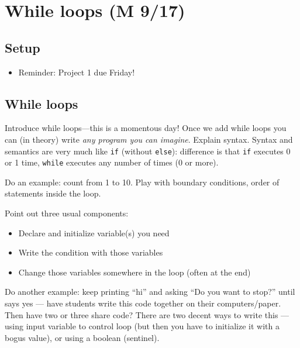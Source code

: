 \documentclass{article}
\newcommand{\eg}{\emph{e.g.}\xspace}
\begin{document}

\newpage
\section{While loops (M 9/17)}

\subsection*{Setup}
\begin{itemize}
\item Reminder: Project 1 due Friday!
\end{itemize}

\subsection*{While loops}

Introduce while loops---this is a momentous day!  Once we add while
loops you can (in theory) write \emph{any program you can imagine}.
Explain syntax.  Syntax and semantics are very much like \verb|if|
(without \verb|else|): difference is that \verb|if| executes 0 or 1
time, \verb|while| executes any number of times (0 or more).

Do an example: count from 1 to 10.  Play with boundary conditions,
order of statements inside the loop.

Point out three usual components:
\begin{itemize}
\item Declare and initialize variable(s) you need
\item Write the condition with those variables
\item Change those variables somewhere in the loop (often at the
  end)
\end{itemize}

Do another example: keep printing ``hi'' and asking ``Do you want to
stop?'' until says yes --- have students write this code together on
their computers/paper.  Then have two or three share code?  There are
two decent ways to write this --- using input variable to control loop
(but then you have to initialize it with a bogus value), or using a
boolean (sentinel).
\end{document}
